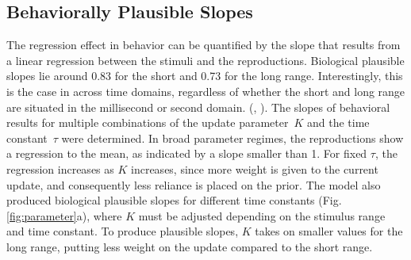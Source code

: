 \documentclass[10pt]{article}
\begin{document}
\subsection{Behaviorally Plausible Slopes}
The regression effect in behavior can be quantified by the slope that results from a linear regression between the stimuli and the reproductions.
Biological plausible slopes lie around 0.83 for the short and 0.73 for the long range.
Interestingly, this is the case in across time domains, regardless of whether the short and long range are situated in the millisecond or second domain. (\cite{Thurley2018}, \cite{Jazayeri2010}). 
The slopes of behavioral results for multiple combinations of the update parameter~$K$ and the time constant~$\tau$ were determined. 
In broad parameter regimes, the reproductions show a regression to the mean, as indicated by a slope smaller than 1. 
For fixed $\tau$, the regression increases as $K$ increases, since more weight is given to the current update, and consequently less reliance is placed on the prior. 
The model also produced biological plausible slopes for different time constants (Fig. \ref{fig:parameter}a), where $K$ must be adjusted depending on the stimulus range and time constant. 
To produce plausible slopes, $K$ takes on smaller values for the long range, putting less weight on the update compared to the short range.
\end{document}
